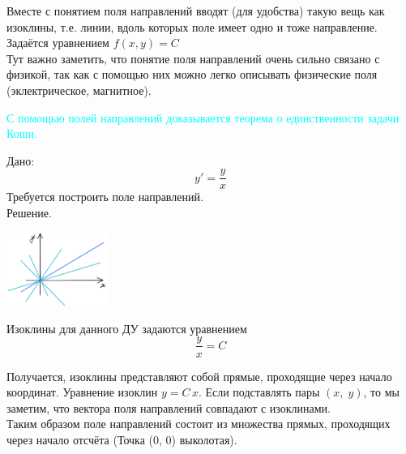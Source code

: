 \begin{figure}[h!]
    \noindent{}
\end{figure}

Вместе с понятием поля направлений вводят (для удобства) такую вещь как изоклины, т.е. линии, вдоль которых поле имеет одно и тоже направление. Задаётся уравнением $f(x, y) = C$\\

Тут важно заметить, что понятие поля направлений очень сильно связано с физикой, так как с помощью них можно легко описывать физические поля (эклектрическое, магнитное).

\textcolor{cyan}{С помощью полей направлений доказывается теорема о единственности задачи Коши.}

\begin{Example}
    Дано: 
    \[
        y' = \frac{y}{x}
    \]
    Требуется построить поле направлений.\\
    Решение.\\
    \begin{floatingfigure}[2]{34mm}
        \noindent
        \hfil
        \includegraphics[height=24mm]{2_1_4.png}
        \hfil
    \end{floatingfigure}
    Изоклины для данного ДУ задаются уравнением 
    \[
        \frac{y}{x} = C
    \]
    
    Получается, изоклины представляют собой прямые, проходящие через начало координат. Уравнение изоклин $y = C\,x$. Если подставлять пары $(x,\; y)$, то мы заметим, что вектора поля направлений совпадают с изоклинами.\\
    Таким образом поле направлений состоит из множества прямых, проходящих через начало отсчёта (Точка (0, 0) выколотая).
\end{Example}

